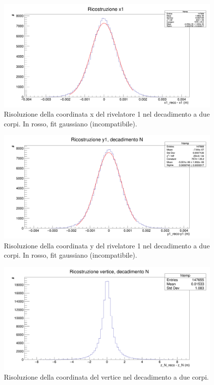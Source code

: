 \documentclass[8pt]{extarticle}
\begin{document}
\begin{figure}[!h]
\begin{center}
\includegraphics[scale=0.24]{reco_x1_N}
\caption{Risoluzione della coordinata x del rivelatore 1 nel decadimento a due corpi. In rosso, fit gaussiano (incompatibile).}
\label{fig:reco_x1_N}
\end{center}
\end{figure}

\clearpage

\begin{figure}[!h]
\begin{center}
\includegraphics[scale=0.20]{reco_y1_N}
\caption{Risoluzione della coordinata y del rivelatore 1 nel decadimento a due corpi. In rosso, fit gaussiano (incompatibile).}
\label{fig:reco_y1_N}
\end{center}
\end{figure}

\begin{figure}[!h]
\begin{center}
\includegraphics[scale=0.25]{reco_z_N}
\caption{Risoluzione della coordinata del vertice nel decadimento a due corpi.}
\label{fig:reco_z_N}
\end{center}
\end{figure}
\end{document}
